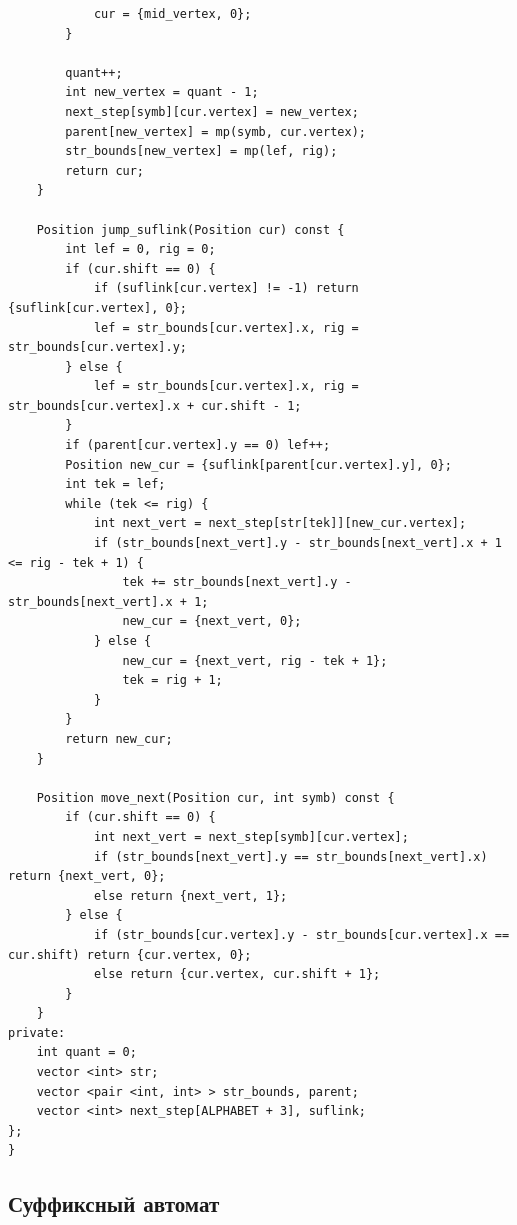 \documentclass[10pt, portrait,letterpaper]{article}
\begin{document}
\begin{verbatim}
            cur = {mid_vertex, 0};
        }
        
        quant++;
        int new_vertex = quant - 1;
        next_step[symb][cur.vertex] = new_vertex;
        parent[new_vertex] = mp(symb, cur.vertex);
        str_bounds[new_vertex] = mp(lef, rig);
        return cur;
    }

    Position jump_suflink(Position cur) const {
        int lef = 0, rig = 0;
        if (cur.shift == 0) {
            if (suflink[cur.vertex] != -1) return {suflink[cur.vertex], 0};
            lef = str_bounds[cur.vertex].x, rig = str_bounds[cur.vertex].y;
        } else {
            lef = str_bounds[cur.vertex].x, rig = str_bounds[cur.vertex].x + cur.shift - 1; 	
        }
        if (parent[cur.vertex].y == 0) lef++;
        Position new_cur = {suflink[parent[cur.vertex].y], 0};
        int tek = lef;
        while (tek <= rig) {
            int next_vert = next_step[str[tek]][new_cur.vertex];
            if (str_bounds[next_vert].y - str_bounds[next_vert].x + 1 <= rig - tek + 1) {
                tek += str_bounds[next_vert].y - str_bounds[next_vert].x + 1;
                new_cur = {next_vert, 0};
            } else {
                new_cur = {next_vert, rig - tek + 1};
                tek = rig + 1;
            }
        }
        return new_cur;
    }

    Position move_next(Position cur, int symb) const {
        if (cur.shift == 0) {
            int next_vert = next_step[symb][cur.vertex];
            if (str_bounds[next_vert].y == str_bounds[next_vert].x) return {next_vert, 0};
            else return {next_vert, 1};
        } else {
            if (str_bounds[cur.vertex].y - str_bounds[cur.vertex].x == cur.shift) return {cur.vertex, 0};
            else return {cur.vertex, cur.shift + 1};
        }
    }
private:
    int quant = 0;
    vector <int> str;
    vector <pair <int, int> > str_bounds, parent;
    vector <int> next_step[ALPHABET + 3], suflink;                   
};
}
\end{verbatim}

\subsection{Суффиксный автомат}
\end{document}

